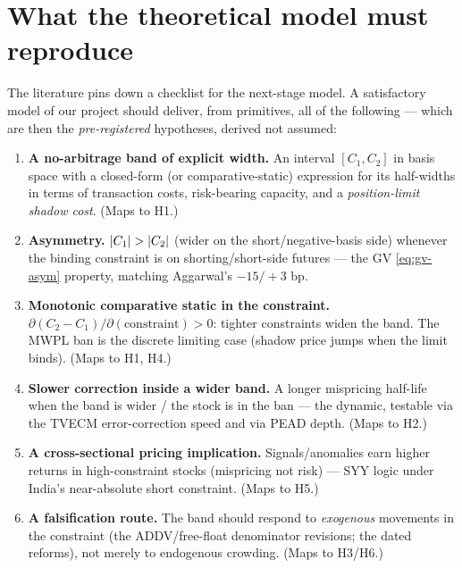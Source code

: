 \section{What the theoretical model must reproduce}
\label{sec:model-requirements}
The literature pins down a checklist for the next-stage model. A satisfactory model of our project should deliver, from primitives, all of the following --- which are then the \emph{pre-registered} hypotheses, derived not assumed:
\begin{enumerate}[leftmargin=1.5em,itemsep=3pt]
\item \textbf{A no-arbitrage band of explicit width.} An interval $[C_1,C_2]$ in basis space with a closed-form (or comparative-static) expression for its half-widths in terms of transaction costs, risk-bearing capacity, and a \emph{position-limit shadow cost}. (Maps to H1.)
\item \textbf{Asymmetry.} $\lvert C_1\rvert > \lvert C_2\rvert$ (wider on the short/negative-basis side) whenever the binding constraint is on shorting/short-side futures --- the GV \eqref{eq:gv-asym} property, matching Aggarwal's $-15/+3$ bp.
\item \textbf{Monotonic comparative static in the constraint.} $\partial(C_2-C_1)/\partial(\text{constraint}) > 0$: tighter constraints widen the band. The MWPL ban is the discrete limiting case (shadow price jumps when the limit binds). (Maps to H1, H4.)
\item \textbf{Slower correction inside a wider band.} A longer mispricing half-life when the band is wider / the stock is in the ban --- the dynamic, testable via the TVECM error-correction speed and via PEAD depth. (Maps to H2.)
\item \textbf{A cross-sectional pricing implication.} Signals/anomalies earn higher returns in high-constraint stocks (mispricing not risk) --- SYY logic under India's near-absolute short constraint. (Maps to H5.)
\item \textbf{A falsification route.} The band should respond to \emph{exogenous} movements in the constraint (the ADDV/free-float denominator revisions; the dated reforms), not merely to endogenous crowding. (Maps to H3/H6.)
\end{enumerate}


